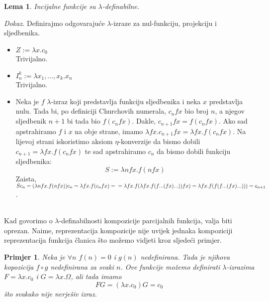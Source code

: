 \documentclass[a4paper,12pt]{article}
\newtheorem{lem}[thm]{Lema}
\newtheorem{exa}[thm]{Primjer}
\newenvironment{proof}{\textit{Dokaz.}}{\hfill}
\begin{document}
\begin{lem}
Incijalne funkcije su $\lambda$-definabilne.
\end{lem}
\begin{proof} Definirajmo odgovarajuće $\lambda$-izraze za nul-funkciju, projekciju i sljedbenika.
\begin{itemize}
	\item $Z := \lambda x. c_0 $\\
		Trivijalno.
	\item $I^k_n := \lambda x_1, ..., x_k . x_n$\\
		Trivijalno.
	\item Neka je $f$ $\lambda$-izraz koji predstavlja funkciju sljedbenika i neka $x$ predstavlja nulu. Tada bi, po definiciji Churchovih numerala, $c_n f x$ bio broj $n$, a njegov sljedbenik $n+1$ bi tada bio $f(c_n f x)$. Dakle, $c_{n+1} f x = f (c_n f x)$. Ako sad apstrahiramo $f$ i $x$ na obje strane, imamo $\lambda f x. c_{n+1} f x = \lambda f x. f (c_n f x)$. Na lijevoj strani iskoristimo aksiom $\eta$-konverzije da bismo dobili $c_{n+1} = \lambda f x. f (c_n f x)$ te sad apstrahiramo $c_n$ da bismo dobili funkciju sljedbenika:
	\[ S := \lambda n f x . f (n f x) \]
		Zaista, $S c_n = (\lambda n f x . f (n f x)) c_n = \lambda f x. f (c_n f x) =\\= \lambda f x. f (\lambda f x. f (f ... (f x) ...)) f x) = \lambda f x. f (f (f ... (f x) ...))) = c_{n+1}$.
\end{itemize}
\end{proof}
\\
Kad govorimo o $\lambda$-definabilnosti kompozicije parcijalnih funkcija, valja biti oprezan. Naime, reprezentacija kompozicije nije uvijek jednaka kompoziciji reprezentacija funkcija članica što možemo vidjeti kroz sljedeći primjer.

\begin{exa} Neka je $\forall n$ $f(n)=0$ i $g(n)$ nedefinirana. Tada je njihova kopozicija $f \circ g$ nedefinirana za svaki $n$. Ove funkcije možemo definirati $\lambda$-izrazima $F = \lambda x. c_0$ i $G = \lambda x. \Omega$, ali tada imamo
	\[ F G = (\lambda x. c_0) G = c_0 \]
što svakako nije nerješiv izraz.
\end{exa}
\end{document}
